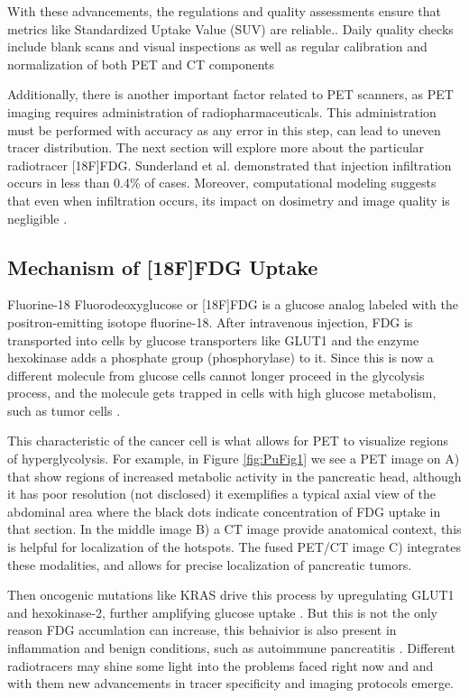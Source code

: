 \begin{multicols}{2}
With these advancements, the regulations and quality assessments ensure that metrics like Standardized Uptake Value (SUV) are reliable.\cite{TG174}. Daily quality checks include blank scans and visual inspections as well as regular calibration and normalization of both PET and CT components

Additionally, there is another important factor related to PET scanners, as PET imaging requires administration of radiopharmaceuticals. This administration must be performed with accuracy as any error in this step, can lead to uneven tracer distribution. The next section will explore more about the particular radiotracer [18F]FDG. Sunderland et al. demonstrated that injection infiltration occurs in less than 0.4\% of cases. Moreover, computational modeling suggests that even when infiltration occurs, its impact on dosimetry and image quality is negligible  \cite{Sunderland2023}. 




\subsection{Mechanism of [18F]FDG Uptake}


Fluorine-18 Fluorodeoxyglucose or [18F]FDG is a glucose analog labeled with the positron-emitting isotope fluorine-18. After intravenous injection, FDG is transported into cells by glucose transporters like GLUT1 and  the enzyme hexokinase adds a phosphate group (phosphorylase) to it. Since this is now a different molecule from glucose cells cannot longer proceed in the glycolysis process, and the molecule gets trapped in cells with high glucose metabolism, such as tumor cells \cite{TG174,Zheng2018}.

This characteristic of the cancer cell is what allows for PET to visualize regions of hyperglycolysis. For example, in Figure \ref{fig:PuFig1} we see a PET image on A) that show regions of increased metabolic activity in the pancreatic head, although it has poor resolution (not disclosed) it exemplifies a typical axial view of the abdominal area where the black dots indicate concentration of FDG uptake in that section. In the middle image B) a CT image provide anatomical context, this is helpful for localization of the hotspots.  The fused PET/CT image C) integrates these modalities, and allows for precise localization of pancreatic tumors.


Then oncogenic mutations like KRAS drive this process by upregulating GLUT1 and hexokinase-2, further amplifying glucose uptake \cite{Deng2021}. But this is not the only reason FDG accumlation can increase, this behaivior is also present in inflammation and benign conditions, such as autoimmune pancreatitis \cite{Zheng2018}. Different radiotracers may shine some light into the problems faced right now and and with them new advancements in tracer specificity and imaging protocols emerge.

\end{multicols}

